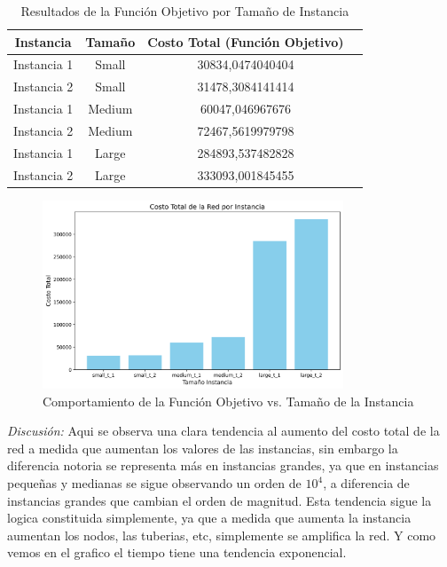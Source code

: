 \documentclass[12pt]{article}
\begin{document}
\begin{table}[H]
    \centering
    \caption{Resultados de la Función Objetivo por Tamaño de Instancia}
    \label{tab:FO_resultados}
    \begin{tabular}{|c|c|c|c|}
        \hline
        \textbf{Instancia} & \textbf{Tamaño} & \textbf{Costo Total (Función Objetivo)} \\
        \hline
        Instancia 1 & Small & 30834,0474040404 \\
        Instancia 2 & Small & 31478,3084141414 \\
        \hline
        Instancia 1 & Medium & 60047,046967676 \\
        Instancia 2 & Medium & 72467,5619979798 \\
        \hline
        Instancia 1 & Large & 284893,537482828 \\
        Instancia 2 & Large & 333093,001845455 \\
        \hline
    \end{tabular}
\end{table}

\begin{figure}[H]
    \centering
    \includegraphics[width=0.8\textwidth]{of_values.png}
    \caption{Comportamiento de la Función Objetivo vs. Tamaño de la Instancia}
    \label{fig:FO_comportamiento}
\end{figure}

\textit{Discusión:}
Aqui se observa una clara tendencia al aumento del costo total de la red a medida que aumentan los valores de las instancias, sin embargo la diferencia notoria se representa más en instancias grandes, ya que en instancias pequeñas y medianas se sigue observando un orden de $10^4$, a diferencia de instancias grandes que cambian el orden de magnitud. Esta tendencia sigue la logica constituida simplemente, ya que a medida que aumenta la instancia aumentan los nodos, las tuberias, etc, simplemente se amplifica la red. Y como vemos en el grafico el tiempo tiene una tendencia exponencial.
\end{document}
